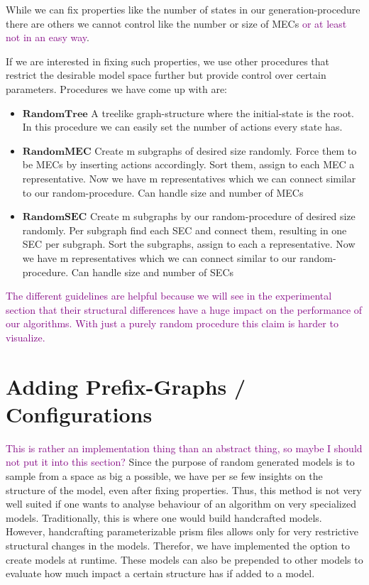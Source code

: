While we can fix properties like the number of states in our generation-procedure there are others we cannot control like the number or size of MECs \textcolor{purple}{or at least not in an easy way}.

If we are interested in fixing such properties, we use other procedures that restrict the desirable model space further but provide control over certain parameters. Procedures we have come up with are:
\begin{itemize}
\item $\textbf{RandomTree}$ A treelike graph-structure where the initial-state is the root. In this procedure we can easily set the number of actions every state has.
\item $\textbf{RandomMEC}$ Create m subgraphs of desired size randomly. Force them to be MECs by inserting actions accordingly. Sort them, assign to each MEC a representative. Now we have m representatives which we can connect similar to our random-procedure. Can handle size and number of MECs
\item $\textbf{RandomSEC}$ Create m subgraphs by our random-procedure of desired size randomly. Per subgraph find each SEC and connect them, resulting in one SEC per subgraph. Sort the subgraphs, assign to each a representative. Now we have m representatives which we can connect similar to our random-procedure. Can handle size and number of SECs
\end{itemize}

\textcolor{purple}{The different guidelines are helpful because we will see in the experimental section that their structural differences have a huge impact on the performance of our algorithms. With just a purely random procedure this claim is harder to visualize.}

\section{Adding Prefix-Graphs / Configurations}
\textcolor{purple}{This is rather an implementation thing than an abstract thing, so maybe I should not put it into this section?}
Since the purpose of random generated models is to sample from a space as big a possible, we have per se few insights on the structure of the model, even after fixing properties. Thus, this method is not very well suited if one wants to analyse behaviour of an algorithm on very specialized models. Traditionally, this is where one would build handcrafted models. However, handcrafting parameterizable prism files allows only for very restrictive structural changes in the models. Therefor, we have implemented the option to create models at runtime. These models can also be prepended to other models to evaluate how much impact a certain structure has if added to a model.

